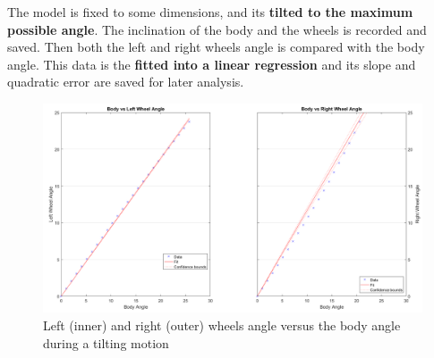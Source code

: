 The model is fixed to some dimensions, and its \textbf{tilted to the maximum possible angle}. The inclination of the body and the wheels is recorded and saved. Then both the left and right wheels angle is compared with the body angle. This data is the \textbf{fitted into a linear regression} and its slope and quadratic error are saved for later analysis.
\begin{figure}
	\includegraphics[width=1.0\linewidth]{figs/05/sim/Relations}
	\caption{Left (inner) and right (outer) wheels angle versus the body angle during a tilting motion}
\end{figure}


